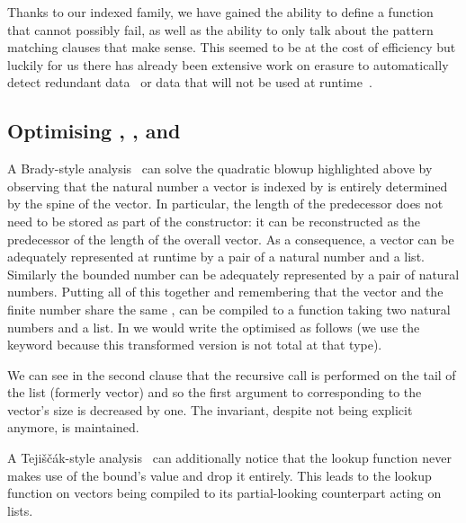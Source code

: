 
Thanks to our indexed family, we have gained the ability to define a function that cannot
possibly fail, as well as the ability to only talk about the pattern matching clauses
that make sense.
This seemed to be at the cost of efficiency but luckily for us there has already been
extensive work on erasure to automatically detect redundant
data~\cite{DBLP:conf/types/BradyMM03} or data that will not be used at
runtime~\cite{DBLP:journals/pacmpl/Tejiscak20}.

\subsection{Optimising , , and }

A Brady-style analysis~\cite{DBLP:conf/types/BradyMM03}
can solve the quadratic blowup highlighted above by observing
that the natural number a vector is indexed by is entirely determined by the spine of
the vector. In particular, the length of the predecessor does not need to be stored
as part of the constructor: it can be reconstructed as the predecessor of the length
of the overall vector. As a consequence, a vector can be adequately represented at
runtime by a pair of a natural number and a list. Similarly the bounded number can be
adequately represented by a pair of natural numbers. Putting all of this together and
remembering that the vector and the finite number share the same ,
 can be compiled to a function taking two natural numbers and a list.
In \idris{} we would write the optimised  as follows (we use the
 keyword because this transformed version is not total at that type).


We can see in the second clause that the recursive call is performed on the tail of
the list (formerly vector) and so the first argument to 
corresponding to the vector's size is decreased by one. The invariant, despite not
being explicit anymore, is maintained.

A Tejiščák-style analysis~\cite{DBLP:journals/pacmpl/Tejiscak20} can additionally
notice that the lookup function never makes
use of the bound's value and drop it entirely. This leads to the lookup function on
vectors being compiled to its partial-looking counterpart acting on lists.

